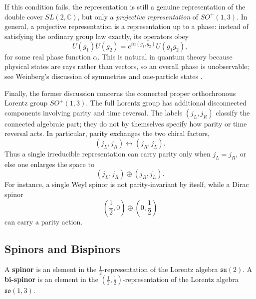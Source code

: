 If this condition fails, the representation is still a genuine representation of the double cover $SL(2,\mathbb{C})$, but only a \textit{projective representation} of $SO^+(1,3)$. 
In general, a projective representation is a representation up to a phase: instead of satisfying the ordinary group law exactly, its operators obey
\[
    U(g_1)U(g_2)=e^{i\alpha(g_1,g_2)}U(g_1g_2),
\]
for some real phase function $\alpha$. This is natural in quantum theory because physical states are rays rather than vectors, so an overall phase is unobservable; see Weinberg's discussion of symmetries and one-particle states \autocite[Chapter~2]{weinbergQFT1995}.

Finally, the former discussion concerns the connected proper orthochronous Lorentz group $SO^+(1,3)$. The full Lorentz group has additional disconnected components involving parity and time reversal. The labels $(j_L,j_R)$ classify the connected algebraic part; they do not by themselves specify how parity or time reversal acts. In particular, parity exchanges the two chiral factors,
\[
    (j_L,j_R) \longleftrightarrow (j_R,j_L).
\]
Thus a single irreducible representation can carry parity only when $j_L=j_R$, or else one enlarges the space to
\[
    (j_L,j_R) \oplus (j_R,j_L).
\]
For instance, a single Weyl spinor is not parity-invariant by itself, while a Dirac spinor
\[
    \left(\frac12,0\right) \oplus \left(0,\frac12\right)
\]
can carry a parity action.

\subsection{Spinors and Bispinors}
\label{subsec:spinors-and-bispinors}

\begin{definition}
\label{def:spinor}
A \textbf{spinor} is an element in the $\frac{1}{2}$-representation of the Lorentz algebra $\mathfrak{su}(2)$. A \textbf{bi-spinor} is an element in the $(\frac{1}{2}, \frac{1}{2})$-representation of the Lorentz algebra $\mathfrak{so}(1,3)$.
\end{definition}

